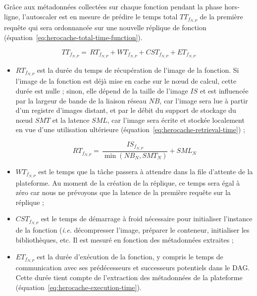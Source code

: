 Grâce aux métadonnées collectées sur chaque fonction pendant la phase hors-ligne, l'autoscaler est en mesure de prédire le temps total ${TT}_{{f}_{N, P}}$ de la première requête qui sera ordonnancée sur une nouvelle réplique de fonction (équation~\ref{eq:herocache-total-time-function}).

\begin{equation}
    {TT}_{{f}_{N, P}} = \, {RT}_{{f}_{N, P}} + {WT}_{{f}_{N, P}} + {CST}_{{f}_{N, P}} + {ET}_{{f}_{N, P}}
\label{eq:herocache-total-time-function}
\end{equation}

\begin{itemize}
    \item ${RT}_{{f}_{N, P}}$ est la durée du temps de récupération de l'image de la fonction. Si l'image de la fonction est déjà mise en cache sur le nœud de calcul, cette durée est nulle ; sinon, elle dépend de la taille de l'image $IS$ et est influencée par la largeur de bande de la liaison réseau $NB$, car l'image sera lue à partir d'un registre d'images distant, et par le débit du support de stockage du nœud $SMT$ et la latence $SML$, car l'image sera écrite et stockée localement en vue d'une utilisation ultérieure (équation~\ref{eq:herocache-retrieval-time}) ;

    \begin{equation}
        {RT}_{{f}_{N, P}} = \, \frac{IS_{{f}_{N, P}}}{\min (NB_{N}, SMT_{N})} + SML_{N}
        \label{eq:herocache-retrieval-time}
    \end{equation}

    \item ${WT}_{{f}_{N, P}}$ est le temps que la tâche passera à attendre dans la file d'attente de la plateforme. Au moment de la création de la réplique, ce temps sera égal à zéro car nous ne prévoyons que la latence de la première requête sur la réplique ;
    \item ${CST}_{{f}_{N, P}}$ est le temps de démarrage à froid nécessaire pour initialiser l'instance de la fonction (\textit{i.e.} décompresser l'image, préparer le conteneur, initialiser les bibliothèques, etc. Il est mesuré en fonction des métadonnées extraites ;
    \item ${ET}_{{f}_{N, P}}$ est la durée d'exécution de la fonction, y compris le temps de communication avec ses prédécesseurs et successeurs potentiels dans le DAG. Cette durée tient compte de l'extraction des métadonnées de la plateforme (équation~\ref{eq:herocache-execution-time}).
\end{itemize}

